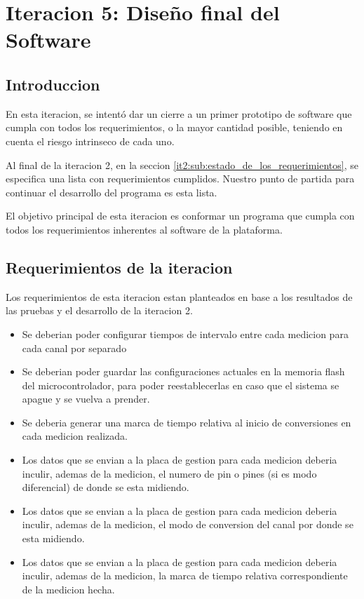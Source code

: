 \chapter{Iteracion 5: Diseño final del Software} %
\label{cha:iteracion_5}

\section{Introduccion} %
\label{it5:sec:introduccion}

En esta iteracion, se intentó dar un cierre a un primer prototipo de software que cumpla con todos los requerimientos, o la mayor cantidad posible, teniendo en cuenta el riesgo intrinseco de cada uno.

Al final de la iteracion 2, en la seccion \ref{it2:sub:estado_de_los_requerimientos}, se especifica una lista con requerimientos cumplidos. Nuestro punto de partida para continuar el desarrollo del programa es esta lista. 

El objetivo principal de esta iteracion es conformar un programa que cumpla con todos los requerimientos inherentes al software de la plataforma.


\section{Requerimientos de la iteracion} %
\label{it5:sec:requerimientos_de_la_iteracion}

Los requerimientos de esta iteracion estan planteados en base a los resultados de las pruebas y el desarrollo de la iteracion 2. 

\begin{itemize}
\item Se deberian poder configurar tiempos de intervalo entre cada medicion para cada canal por separado
\item Se deberian poder guardar las configuraciones actuales en la memoria flash del microcontrolador, para poder reestablecerlas en caso que el sistema se apague y se vuelva a prender.
\item Se deberia generar una marca de tiempo relativa al inicio de conversiones en cada medicion realizada.
\item Los datos que se envian a la placa de gestion para cada medicion deberia inculir, ademas de la medicion, el numero de pin o pines (si es modo diferencial) de donde se esta midiendo. 
\item Los datos que se envian a la placa de gestion para cada medicion deberia inculir, ademas de la medicion, el modo de conversion del canal por donde se esta midiendo.
\item Los datos que se envian a la placa de gestion para cada medicion deberia inculir, ademas de la medicion, la marca de tiempo relativa correspondiente de la medicion hecha. 
\end{itemize}


